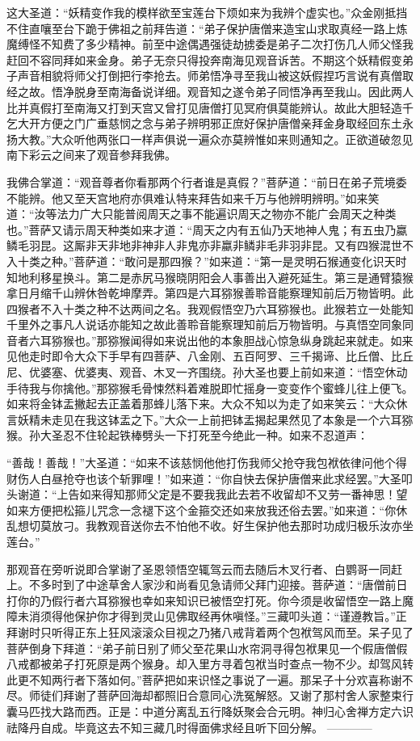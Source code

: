 \documentclass[12pt,UTF8]{ctexbook}
\begin{document}
这大圣道：“妖精变作我的模样欲至宝莲台下烦如来为我辨个虚实也。”众金刚抵挡不住直嚷至台下跪于佛祖之前拜告道：“弟子保护唐僧来造宝山求取真经一路上炼魔缚怪不知费了多少精神。前至中途偶遇强徒劫掳委是弟子二次打伤几人师父怪我赶回不容同拜如来金身。弟子无奈只得投奔南海见观音诉苦。不期这个妖精假变弟子声音相貌将师父打倒把行李抢去。师弟悟净寻至我山被这妖假捏巧言说有真僧取经之故。悟净脱身至南海备说详细。观音知之遂令弟子同悟净再至我山。因此两人比并真假打至南海又打到天宫又曾打见唐僧打见冥府俱莫能辨认。故此大胆轻造千乞大开方便之门广垂慈悯之念与弟子辨明邪正庶好保护唐僧亲拜金身取经回东土永扬大教。”大众听他两张口一样声俱说一遍众亦莫辨惟如来则通知之。正欲道破忽见南下彩云之间来了观音参拜我佛。

我佛合掌道：“观音尊者你看那两个行者谁是真假？”菩萨道：“前日在弟子荒境委不能辨。他又至天宫地府亦俱难认特来拜告如来千万与他辨明辨明。”如来笑道：“汝等法力广大只能普阅周天之事不能遍识周天之物亦不能广会周天之种类也。”菩萨又请示周天种类如来才道：“周天之内有五仙乃天地神人鬼；有五虫乃蠃鳞毛羽昆。这厮非天非地非神非人非鬼亦非蠃非鳞非毛非羽非昆。又有四猴混世不入十类之种。”菩萨道：“敢问是那四猴？”如来道：“第一是灵明石猴通变化识天时知地利移星换斗。第二是赤尻马猴晓阴阳会人事善出入避死延生。第三是通臂猿猴拿日月缩千山辨休咎乾坤摩弄。第四是六耳猕猴善聆音能察理知前后万物皆明。此四猴者不入十类之种不达两间之名。我观假悟空乃六耳猕猴也。此猴若立一处能知千里外之事凡人说话亦能知之故此善聆音能察理知前后万物皆明。与真悟空同象同音者六耳猕猴也。”那猕猴闻得如来说出他的本象胆战心惊急纵身跳起来就走。如来见他走时即令大众下手早有四菩萨、八金刚、五百阿罗、三千揭谛、比丘僧、比丘尼、优婆塞、优婆夷、观音、木叉一齐围绕。孙大圣也要上前如来道：“悟空休动手待我与你擒他。”那猕猴毛骨悚然料着难脱即忙摇身一变变作个蜜蜂儿往上便飞。如来将金钵盂撇起去正盖着那蜂儿落下来。大众不知以为走了如来笑云：“大众休言妖精未走见在我这钵盂之下。”大众一上前把钵盂揭起果然见了本象是一个六耳猕猴。孙大圣忍不住轮起铁棒劈头一下打死至今绝此一种。如来不忍道声：

“善哉！善哉！”大圣道：“如来不该慈悯他他打伤我师父抢夺我包袱依律问他个得财伤人白昼抢夺也该个斩罪哩！”如来道：“你自快去保护唐僧来此求经罢。”大圣叩头谢道：“上告如来得知那师父定是不要我我此去若不收留却不又劳一番神思！望如来方便把松箍儿咒念一念褪下这个金箍交还如来放我还俗去罢。”如来道：“你休乱想切莫放刁。我教观音送你去不怕他不收。好生保护他去那时功成归极乐汝亦坐莲台。”

那观音在旁听说即合掌谢了圣恩领悟空辄驾云而去随后木叉行者、白鹦哥一同赶上。不多时到了中途草舍人家沙和尚看见急请师父拜门迎接。菩萨道：“唐僧前日打你的乃假行者六耳猕猴也幸如来知识已被悟空打死。你今须是收留悟空一路上魔障未消须得他保护你才得到灵山见佛取经再休嗔怪。”三藏叩头道：“谨遵教旨。”正拜谢时只听得正东上狂风滚滚众目视之乃猪八戒背着两个包袱驾风而至。呆子见了菩萨倒身下拜道：“弟子前日别了师父至花果山水帘洞寻得包袱果见一个假唐僧假八戒都被弟子打死原是两个猴身。却入里方寻着包袱当时查点一物不少。却驾风转此更不知两行者下落如何。”菩萨把如来识怪之事说了一遍。那呆子十分欢喜称谢不尽。师徒们拜谢了菩萨回海却都照旧合意同心洗冤解怒。又谢了那村舍人家整束行囊马匹找大路而西。正是：中道分离乱五行降妖聚会合元明。神归心舍禅方定六识祛降丹自成。毕竟这去不知三藏几时得面佛求经且听下回分解。
------------
\end{document}
